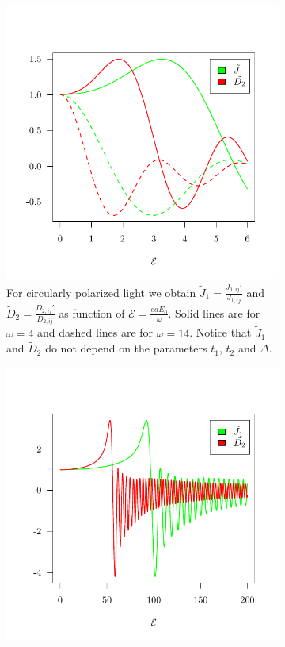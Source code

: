 \documentclass[aps,prl,twocolumn,amsmath,amssymb,nobibnotes]{revtex4-1}%
\begin{document}
\begin{figure}[t]
\begin{subfigure}{0.7\columnwidth}
\includegraphics[width=\columnwidth]{../Figures/NNvsNNN1.pdf}
\caption{For circularly polarized light we obtain $\tilde{J}_1 = \frac{J_{1,ij}'}{J_{1,ij}}$ and $\tilde{D}_{2} = \frac{D_{2,ij}'}{D_{2,ij}}$ as function of $\mathcal{E} = \frac{eaE_0}{\omega}$. Solid lines are for $\omega = 4$ and dashed lines are for $\omega = 14$. Notice that $\tilde{J}_1$ and $\tilde{D}_{2}$ do not depend on the parameters $t_1$, $t_2$ and $\Delta$.}
\label{fig2}
\end{subfigure}
\hfill
\begin{subfigure}{0.7\columnwidth}
\includegraphics[width=\columnwidth]{../Figures/NNvsNNN2.pdf}

\end{subfigure}
\end{figure}
\end{document}
